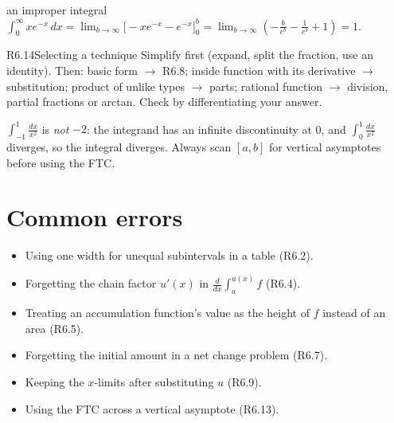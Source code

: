 \documentclass{apcalc}
\begin{document}
\begin{example}{an improper integral}
$\displaystyle\int_0^\infty xe^{-x}\,dx=\lim_{b\to\infty}\Big[-xe^{-x}-e^{-x}\Big]_0^b=\lim_{b\to\infty}\left(-\frac{b}{e^b}-\frac{1}{e^b}+1\right)=1.$ 
\end{example}

\begin{rulebox}{R6.14}{Selecting a technique}
Simplify first (expand, split the fraction, use an identity). Then: basic form $\to$ R6.8; inside function with its derivative $\to$ substitution; product of unlike types $\to$ parts; rational function $\to$ division, partial fractions or arctan. Check by differentiating your answer.
\end{rulebox}

\begin{trap}
$\int_{-1}^{1}\frac{dx}{x^2}$ is \emph{not} $-2$: the integrand has an infinite discontinuity at 0, and $\int_0^1\frac{dx}{x^2}$ diverges, so the integral diverges. Always scan $[a,b]$ for vertical asymptotes before using the FTC.
\end{trap}

\section{Common errors}
\begin{itemize}
\item Using one width for unequal subintervals in a table (R6.2).
\item Forgetting the chain factor $u'(x)$ in $\frac{d}{dx}\int_a^{u(x)}f$ (R6.4).
\item Treating an accumulation function's value as the height of $f$ instead of an area (R6.5).
\item Forgetting the initial amount in a net change problem (R6.7).
\item Keeping the $x$-limits after substituting $u$ (R6.9).
\item Using the FTC across a vertical asymptote (R6.13).
\end{itemize}
\end{document}
